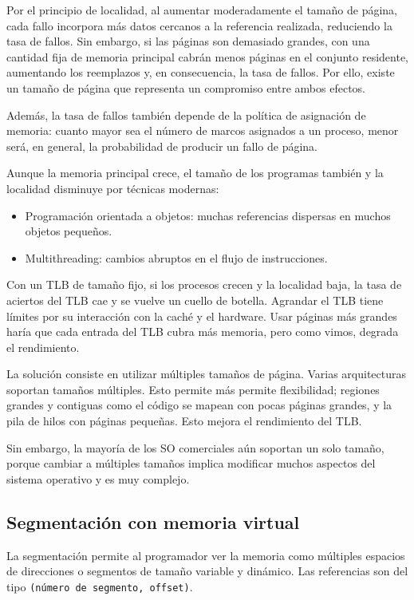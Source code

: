 Por el principio de localidad, al aumentar moderadamente el tamaño de página, cada fallo incorpora más datos cercanos a la referencia realizada, reduciendo la tasa de fallos. Sin embargo, si las páginas son demasiado grandes, con una cantidad fija de memoria principal cabrán menos páginas en el conjunto residente, aumentando los reemplazos y, en consecuencia, la tasa de fallos. Por ello, existe un tamaño de página que representa un compromiso entre ambos efectos.

Además, la tasa de fallos también depende de la política de asignación de memoria: cuanto mayor sea el número de marcos asignados a un proceso, menor será, en general, la probabilidad de producir un fallo de página.

Aunque la memoria principal crece, el tamaño de los programas también y la localidad disminuye por técnicas modernas:
\begin{itemize}
  \item Programación orientada a objetos: muchas referencias dispersas en muchos objetos pequeños.
  \item Multithreading: cambios abruptos en el flujo de instrucciones.
\end{itemize}

Con un TLB de tamaño fijo, si los procesos crecen y la localidad baja, la tasa de aciertos del TLB cae y se vuelve un cuello de botella. Agrandar el TLB tiene límites por su interacción con la caché y el hardware. Usar páginas más grandes haría que cada entrada del TLB cubra más memoria, pero como vimos, degrada el rendimiento.

La solución consiste en utilizar múltiples tamaños de página.
Varias arquitecturas soportan tamaños múltiples. Esto permite más permite flexibilidad; regiones grandes y contiguas como el código se mapean con pocas páginas grandes, y la pila de hilos con páginas pequeñas. Esto mejora el rendimiento del TLB.

Sin embargo, la mayoría de los SO comerciales aún soportan un solo tamaño, porque cambiar a múltiples tamaños implica modificar muchos aspectos del sistema operativo y es muy complejo.

\subsection{Segmentación con memoria virtual}

La segmentación permite al programador ver la memoria como múltiples espacios de direcciones o segmentos de tamaño variable y dinámico. Las referencias son del tipo \texttt{(número de segmento, offset)}.

